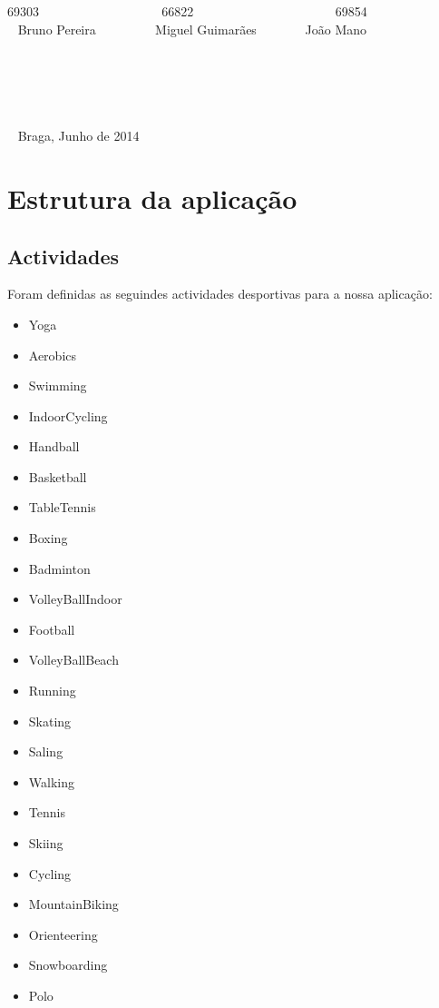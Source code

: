 \documentclass[10pt,notitlepage]{article}
\begin{document}
\begin{titlepage}
\begin{center}
69303 ~~~~~~~~~~~~~~~~~~ 66822 ~~~~~~~~~~~~~~~~~~~~~ 69854   \\~ Bruno Pereira  ~~~~~~~~ Miguel Guimarães ~~~~~~~João Mano  \\~ \\~ \\~ \\~ \\~ \\~ Braga, Junho de 2014
\end{center}
\end{titlepage}




\tableofcontents

\newpage


\section{Estrutura da aplicação}

\subsection{Actividades}
Foram definidas as seguindes actividades desportivas para a nossa aplicação:
\begin{multicols}{2}
\begin{itemize}
\item Yoga
\item Aerobics
\item Swimming
\item IndoorCycling
\item Handball
\item Basketball
\item TableTennis
\item Boxing
\item Badminton
\item VolleyBallIndoor
\item Football
\item VolleyBallBeach
\item Running
\item Skating
\item Saling
\item Walking
\item Tennis
\item Skiing
\item Cycling
\item MountainBiking
\item Orienteering
\item Snowboarding
\item Polo
\end{itemize}
\end{multicols}
\end{document}
